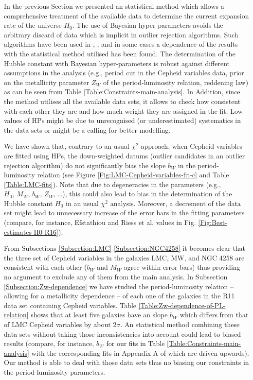 In the previous Section we presented an statistical method which allows a comprehensive treatment of the available data to determine the current expansion rate of the universe $H_0$. The use of Bayesian hyper-parameters avoids the arbitrary discard of data which is implicit in outlier rejection algorithms. Such algorithms have been used in  \cite{Riess:2009pu}, \cite{Riess:2011yx}, \cite{Efstathiou:2013via} and in some cases a dependence of the results with the statistical method utilised has been found. The determination of the Hubble constant with Bayesian hyper-parameters is robust against different assumptions in the analysis (e.g., period cut in the Cepheid variables data, prior on the metallicity parameter $Z_W$ of the period-luminosity relation, reddening law) as can be seen from Table \ref{Table:Constraints-main-analysis}. In Addition, since the method utilises all the available data sets, it allows to check how consistent with each other they are and how much weight they are assigned in the fit. Low values of HPs might be due to unrecognised (or underestimated) systematics in the data sets or might be a calling for better modelling.

We have shown that, contrary to an usual $\chi^2$ approach, when Cepheid variables are fitted using HPs, the down-weighted datums (outlier candidates in an outlier rejection algorithm) do not significantly bias the slope $b_W$ in the period-luminosity relation (see Figure \ref{Fig:LMC-Cepheid-variables-fit-c} and Table \ref{Table:LMC-fits}). Note that due to degeneracies in the parameters (e.g., $H_0,\, M_W,\, b_W,\, Z_W,\,$\dots), this could also lead to bias in the determination of the Hubble constant $H_0$ in an usual $\chi^2$ analysis. Moreover, a decrement of the data set might lead to unnecessary increase of the error bars in the fitting parameters (compare, for instance, Efstathiou \cite{Efstathiou:2013via} and Riess et al. \cite{Riess:2011yx} values in Fig. \ref{Fig:Best-estimates-H0-R16}).

From Subsections \ref{Subsection:LMC}-\ref{Subsection:NGC4258} it becomes clear that the three set of Cepheid variables in the galaxies LMC, MW, and NGC 4258 are consistent with each other ($b_W$ and $M_W$ agree within error bars) thus providing no argument to exclude any of them from the main analysis. In Subsection \ref{Subsection:Zw-dependence} we have studied the period-luminosity relation -- allowing for a metallicity dependence -- of each one of the galaxies in the R11 data set containing Cepheid variables. Table \ref{Table:Zw-dependence-of-PL-relation} shows that at least five galaxies have an slope $b_W$ which differs from that of LMC Cepheid variables by about $2\sigma$. An statistical method combining these data sets without taking those inconsistencies into account could lead to biased results (compare, for instance, $b_W$ for our fits in Table \ref{Table:Constraints-main-analysis} with the corresponding fits in Appendix A of \cite{Efstathiou:2013via} which are driven upwards). Our method is able to deal with those data sets thus no biasing our constraints in the period-luminosity parameters.

